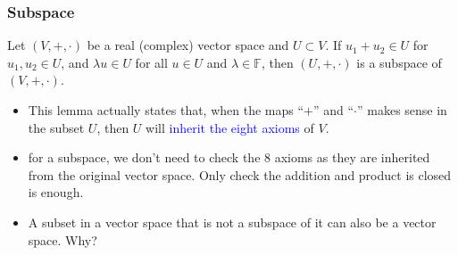 \documentclass{beamer}
\begin{document}
\begin{frame}
    \frametitle{Subspace}
\hspace{1em}
Let $(V,+,\cdot)$ be a real (complex) vector space and $U\subset V$. If $u_1+u_2\in U$ for $u_1,u_2\in U$, and $\lambda u\in U$ for all $u\in U$ and $\lambda \in \mathbb{F}$, then $(U,+,\cdot)$ is a 
subspace of $(V,+,\cdot)$.\\

\hspace{1em}
\begin{itemize}
    \item This lemma actually states that, when the maps “$+$” and “$\cdot$” makes sense in the subset $U$, then $U$ will \textcolor{blue}{inherit the eight axioms} of $V$.
    \item for a subspace, we don’t need to check the 8 axioms as they are
    inherited from the original vector space. Only check the addition and product is closed is enough.    
    \item A subset in a vector space that is not a subspace of it can also be a vector space. Why?
\end{itemize}


\end{frame}
\end{document}
